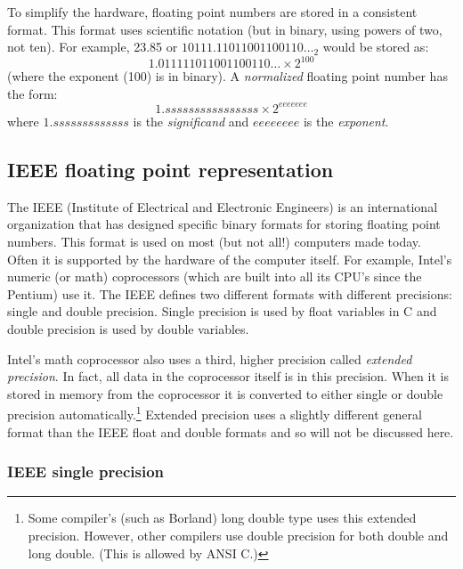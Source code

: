 To simplify the hardware, floating point numbers are stored in a consistent
format. This format uses scientific notation (but in binary, using powers of
two, not ten). For example, 23.85 or $10111.11011001100110\ldots_2$ would be
stored as:
\[ 1.011111011001100110\ldots \times 2^{100} \]
(where the exponent (100) is in binary). A \emph{normalized} floating point
number has the form:
\[ 1.ssssssssssssssss \times 2^{eeeeeee} \]
where $1.sssssssssssss$ is the \emph{significand} and $eeeeeeee$ is the
\emph{exponent}.

\subsection{IEEE floating point representation}

The IEEE (Institute of Electrical and Electronic Engineers) is an
international organization that has designed specific binary formats
for storing floating point num\-bers. This format is used on most (but
not all!)  computers made today. Often it is supported by the hardware
of the computer itself. For example, Intel's numeric (or math)
coprocessors (which are built into all its CPU's since the Pentium)
use it. The IEEE defines two different formats with different
precisions: single and double precision. Single precision is used by
{\code float} variables in C and double precision is used by {\code
double} variables.

Intel's math coprocessor also uses a third, higher precision called
\emph{extended precision}. In fact, all data in the coprocessor itself is
in this precision. When it is stored in memory from the coprocessor it
is converted to either single or double precision automatically.\footnote{
Some compiler's (such as Borland) {\code long double} type uses this
extended precision. However, other compilers use double precision for
both {\code double} and {\code long double}. (This is allowed by ANSI C.)}
Extended precision uses a slightly different general format than the
IEEE float and double formats and so will not be discussed here.

\subsubsection{IEEE single precision}

